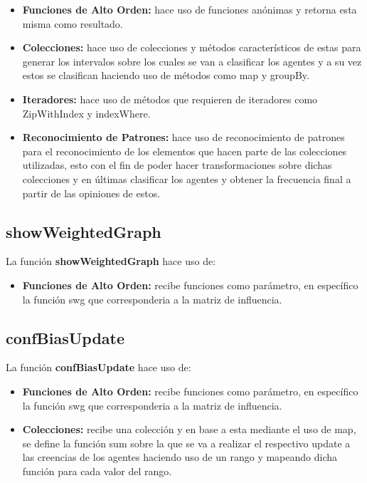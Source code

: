 \documentclass{article}
\begin{document}
    \begin{itemize}
      \item \textbf{Funciones de Alto Orden:} hace uso de funciones anónimas y retorna esta misma como resultado.
      \item \textbf{Colecciones:} hace uso de colecciones y métodos característicos de estas para generar los intervalos sobre los cuales se van a clasificar los agentes y a su vez estos se clasifican haciendo uso de métodos como map y groupBy.
      \item \textbf{Iteradores:} hace uso de métodos que requieren de iteradores como ZipWithIndex y indexWhere.
      \item \textbf{Reconocimiento de Patrones:} hace uso de reconocimiento de patrones para el reconocimiento de los elementos que hacen parte de las colecciones utilizadas, esto con el fin de poder hacer transformaciones sobre dichas colecciones y en últimas clasificar los agentes y obtener la frecuencia final a partir de las opiniones de estos.
    \end{itemize}

    \subsection{showWeightedGraph}
    La función \textbf{showWeightedGraph} hace uso de:

    \begin{itemize}
      \item \textbf{Funciones de Alto Orden:} recibe funciones como parámetro, en específico la función swg que corresponderia a la matriz de influencia.
    \end{itemize}

    \subsection{confBiasUpdate}
    La función \textbf{confBiasUpdate} hace uso de:

    \begin{itemize}
      \item \textbf{Funciones de Alto Orden:} recibe funciones como parámetro, en específico la función swg que corresponderia a la matriz de influencia.
      \item \textbf{Colecciones:} recibe una colección y en base a esta mediante el uso de map, se define la función sum sobre la que se va a realizar el respectivo update a las creencias de los agentes haciendo uso de un rango y mapeando dicha función para cada valor del rango.
    \end{itemize}
\end{document}
